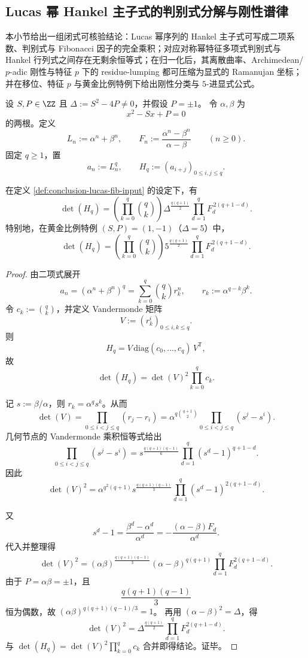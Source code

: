 \subsection{Lucas 幂 Hankel 主子式的判别式分解与刚性谱律}\label{subsec:conclusion-lucas-hankel-discriminant-rigidity}
本小节给出一组闭式可核验结论：Lucas 幂序列的 Hankel 主子式可写成二项系数、判别式与 Fibonacci 因子的完全乘积；对应对称幂特征多项式判别式与 Hankel 行列式之间存在无剩余恒等式；在归一化后，其离散曲率、Archimedean/\(p\)-adic 刚性与特征 \(p\) 下的 residue-lumping 都可压缩为显式的 Ramanujan 坐标；并在移位、特征 \(p\) 与黄金比例特例下给出刚性分类与 \(5\)-进显式公式。

\begin{definition}\label{def:conclusion-lucas-fib-input}
设 \(S,P\in\ZZ\) 且 \(\Delta:=S^2-4P\neq 0\)，并假设 \(P=\pm 1\)。
令 \(\alpha,\beta\) 为
\[
x^2-Sx+P=0
\]
的两根。定义
\[
L_n:=\alpha^n+\beta^n,\qquad
F_n:=\frac{\alpha^n-\beta^n}{\alpha-\beta}\qquad (n\ge 0).
\]
固定 \(q\ge 1\)，置
\[
a_n:=L_n^q,\qquad
H_q:=(a_{i+j})_{0\le i,j\le q}.
\]
\end{definition}

\begin{theorem}\label{thm:conclusion-lucas-power-hankel-closed-form}
在定义 \ref{def:conclusion-lucas-fib-input} 的设定下，有
\[
\det(H_q)
=
\left(\prod_{k=0}^{q}\binom{q}{k}\right)
\Delta^{\frac{q(q+1)}{2}}
\prod_{d=1}^{q}F_d^{\,2(q+1-d)}.
\]
特别地，在黄金比例特例 \((S,P)=(1,-1)\)（\(\Delta=5\)）中，
\[
\det(H_q)
=
\left(\prod_{k=0}^{q}\binom{q}{k}\right)
5^{\frac{q(q+1)}{2}}
\prod_{d=1}^{q}F_d^{\,2(q+1-d)}.
\]
\end{theorem}
\begin{proof}
由二项式展开
\[
a_n=(\alpha^n+\beta^n)^q
=\sum_{k=0}^{q}\binom{q}{k}r_k^n,\qquad
r_k:=\alpha^{q-k}\beta^k.
\]
令 \(c_k:=\binom{q}{k}\)，并定义 Vandermonde 矩阵
\[
V:=(r_k^i)_{0\le i,k\le q}.
\]
则
\[
H_q=V\,\mathrm{diag}(c_0,\dots,c_q)\,V^{\mathsf T},
\]
故
\[
\det(H_q)=\det(V)^2\prod_{k=0}^{q}c_k.
\]

记 \(s:=\beta/\alpha\)，则 \(r_k=\alpha^q s^k\)。从而
\[
\det(V)=\prod_{0\le i<j\le q}(r_j-r_i)
=\alpha^{q\binom{q+1}{2}}
\prod_{0\le i<j\le q}(s^j-s^i).
\]
几何节点的 Vandermonde 乘积恒等式给出
\[
\prod_{0\le i<j\le q}(s^j-s^i)
=
s^{\frac{q(q+1)(q-1)}{6}}
\prod_{d=1}^{q}(s^d-1)^{q+1-d}.
\]
因此
\[
\det(V)^2
=
\alpha^{q^2(q+1)}
s^{\frac{q(q+1)(q-1)}{3}}
\prod_{d=1}^{q}(s^d-1)^{2(q+1-d)}.
\]

又
\[
s^d-1
=\frac{\beta^d-\alpha^d}{\alpha^d}
=-\frac{(\alpha-\beta)F_d}{\alpha^d}.
\]
代入并整理得
\[
\det(V)^2
=
(\alpha\beta)^{\frac{q(q+1)(q-1)}{3}}
(\alpha-\beta)^{q(q+1)}
\prod_{d=1}^{q}F_d^{2(q+1-d)}.
\]
由于 \(P=\alpha\beta=\pm1\)，且
\[
\frac{q(q+1)(q-1)}{3}
\]
恒为偶数，故
\(
(\alpha\beta)^{q(q+1)(q-1)/3}=1
\)。
再用 \((\alpha-\beta)^2=\Delta\)，得
\[
\det(V)^2
=
\Delta^{\frac{q(q+1)}{2}}
\prod_{d=1}^{q}F_d^{2(q+1-d)}.
\]
与 \(\det(H_q)=\det(V)^2\prod_{k=0}^{q}c_k\) 合并即得结论。证毕。
\end{proof}

